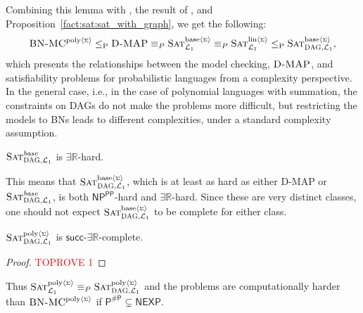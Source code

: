 \documentclass[a4paper,UKenglish,cleveref, autoref, thm-restate]{lipics-v2021}
\newcommand{\IR}{\mathbb{R}}
\newcommand{\existsR}{\ensuremath{\mathsf{\exists\IR}}}
\newcommand{\succR}{\ensuremath{\mathsf{succ\text{-}\exists\IR}}}
\newcommand{\NP}{\ensuremath{\mathsf{NP}}}
\newcommand{\cP}{\ensuremath{\mathsf{P}}}
\newcommand{\NEXP}{\ensuremath{\mathsf{NEXP}}}
\newcommand{\ccPP}{\ensuremath{\mathsf{PP}}}
\newcommand{\sharpP}{\#\mathsf{P}}
\newcommand{\leqp}{\leq_{\text{P}}}
\newcommand{\cL}{{\mathcal L}}
\def\probsumname#1#2{^{\text{#1}{\langle{\scriptscriptstyle\Sigma}\rangle}}_{\text{#2}}}
\def\probsumgraphname#1#2{^{\text{#1}{\langle{\scriptscriptstyle\Sigma}\rangle}}_{\mbox{\scriptsize\sc DAG}, \text{#2}}}
\newcommand{\SATprobcompgraph}{\mbox{\sc Sat}^{\textit{base}}_{\mbox{\scriptsize\sc DAG}, {\cL_1}}}
\newcommand{\SATprobcompsumgraph}{\mbox{\sc Sat}\probsumgraphname{base}{${\cal L}_1$}}
\newcommand{\SATprobpolysumgraph}{\mbox{\sc Sat}\probsumgraphname{poly}{${\cal L}_1$}}
\def\probsumBN#1{^{\text{#1}{\langle{\scriptscriptstyle\Sigma}\rangle}}}
\newcommand{\SATprobpolysumBN}{\mbox{\sc BN-MC}\probsumBN{poly}}
\newcommand{\SATprobcompsum}{\mbox{\sc Sat}\probsumname{base}{${\cal L}_1$}}
\newcommand{\SATproblinsum}{\mbox{\sc Sat}\probsumname{lin}{${\cal L}_1$}}
\newcommand{\SATprobpolysum}{\mbox{\sc Sat}\probsumname{poly}{${\cal L}_1$}}
\begin{document}
Combining this lemma with \cite[Thm. 4]{doerflerICLR2025}, the result 
of \cite{park2004complexity}, and Proposition~\ref{fact:sat:sat_with_graph}, we get the following:
$$
 \SATprobpolysumBN \leqp \mbox{\sc D-MAP} \equiv_ P \SATprobcompsum \equiv_ P  \SATproblinsum  \leqp \SATprobcompsumgraph, 
 $$
which presents the relationships between the model checking,  $\mbox{\sc D-MAP}$, and satisfiability problems
for probabilistic languages  from a complexity perspective.
In the general case, i.e., in the case of polynomial languages with summation, the constraints on DAGs do not make the problems more difficult, but restricting the models to BNs leads to different complexities,  under a standard complexity assumption.

\begin{lemma}\label{prop:prob:comp:sum:graph:er:hard}
$\SATprobcompgraph$ is $ \existsR$-hard.     
\end{lemma}


This means that $\SATprobcompsumgraph$, which is at least as hard as either {\sc D-MAP} or $\SATprobcompgraph$, is both $\NP^{\ccPP}$-hard and $\existsR$-hard. Since these are very distinct classes, one should not expect $\SATprobcompsumgraph$ to be complete for either class. 

\begin{proposition}\label{prop:SATprobstargraph:1:new1}
	$\SATprobpolysumgraph$ is $ \succR$-complete. 
\end{proposition}
\begin{proof}\textcolor{red}{TOPROVE 1}\end{proof}

Thus
 $\SATprobpolysum \equiv_P \SATprobpolysumgraph$
 and the problems are computationally harder than $\SATprobpolysumBN$ if $\cP^{\sharpP} \subsetneq \NEXP .$ 
\end{document}
